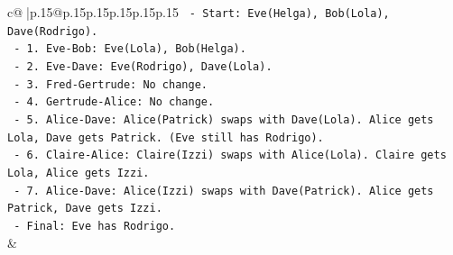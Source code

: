 \documentclass{article}
\begin{document}
{\begin{supertabular}{c@{$\;$}|p{.15\linewidth}@{}p{.15\linewidth}p{.15\linewidth}p{.15\linewidth}p{.15\linewidth}p{.15\linewidth}}
{{{\texttt{   {-} Start: Eve(Helga), Bob(Lola), Dave(Rodrigo).} \\
\texttt{   {-} 1. Eve{-}Bob: Eve(Lola), Bob(Helga).} \\
\texttt{   {-} 2. Eve{-}Dave: Eve(Rodrigo), Dave(Lola).} \\
\texttt{   {-} 3. Fred{-}Gertrude: No change.} \\
\texttt{   {-} 4. Gertrude{-}Alice: No change.} \\
\texttt{   {-} 5. Alice{-}Dave: Alice(Patrick) swaps with Dave(Lola). Alice gets Lola, Dave gets Patrick. (Eve still has Rodrigo).} \\
\texttt{   {-} 6. Claire{-}Alice: Claire(Izzi) swaps with Alice(Lola). Claire gets Lola, Alice gets Izzi.} \\
\texttt{   {-} 7. Alice{-}Dave: Alice(Izzi) swaps with Dave(Patrick). Alice gets Patrick, Dave gets Izzi.} \\
\texttt{   {-} Final: Eve has Rodrigo.} \\
            }
        }
    }
    & \\ \\

\end{supertabular}
}
\end{document}
